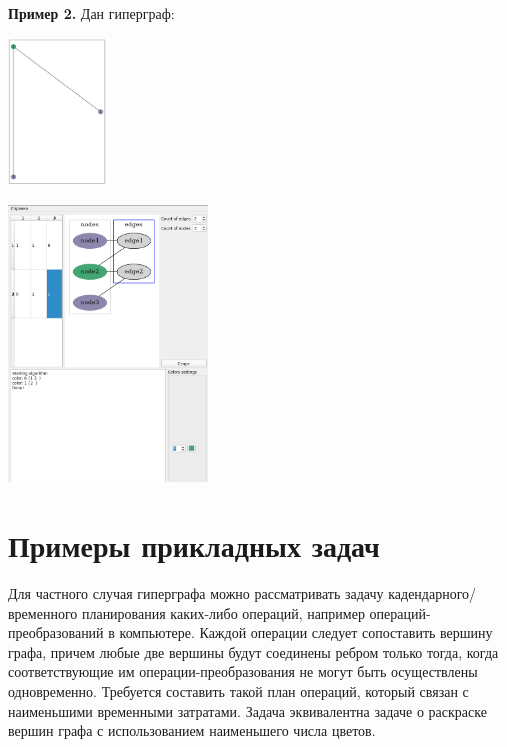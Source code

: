 \documentclass[a4paper, 12pt]{article}
\begin{document}
\textbf{Пример 2.} Дан гиперграф:

        \includegraphics[width=100px]{8_2_true_graph.png}

        \includegraphics[width=200px]{8_2_program}

\section{Примеры прикладных задач}
Для частного случая гиперграфа можно рассматривать задачу кадендарного/временного планирования каких-либо операций, например
операций-преобразований в компьютере. Каждой операции следует сопоставить вершину графа, причем любые две вершины будут соединены ребром только тогда,
когда соответствующие им операции-преобразования не могут быть осуществлены одновременно. 
Требуется составить такой план операций, который связан с наименьшими временными затратами.
Задача эквивалентна задаче о раскраске вершин графа с использованием наименьшего числа цветов.
\end{document}
